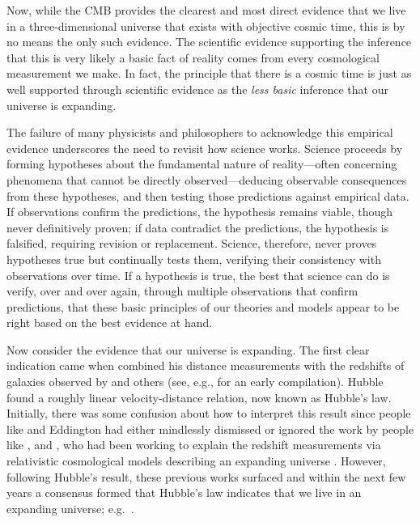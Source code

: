 \documentclass[aps,rmp,groupedaddress,twocolumn,10pt]{revtex4-2}
\begin{document}
Now, while the CMB provides the clearest and most direct evidence that we live in a three-dimensional universe that exists with objective cosmic time, this is by no means the only such evidence. The scientific evidence supporting the inference that this is very likely a basic fact of reality comes from every cosmological measurement we make. In fact, the principle that there is a cosmic time is just as well supported through scientific evidence as the \textit{less basic} inference that our universe is expanding.

The failure of many physicists and philosophers to acknowledge this empirical evidence underscores the need to revisit how science works. Science proceeds by forming hypotheses about the fundamental nature of reality---often concerning phenomena that cannot be directly observed---deducing observable consequences from these hypotheses, and then testing those predictions against empirical data. If observations confirm the predictions, the hypothesis remains viable, though never definitively proven; if data contradict the predictions, the hypothesis is falsified, requiring revision or replacement. Science, therefore, never proves hypotheses true but continually tests them, verifying their consistency with observations over time. If a hypothesis is true, the best that science can do is verify, over and over again, through multiple observations that confirm predictions, that these basic principles of our theories and models appear to be right based on the best evidence at hand.

Now consider the evidence that our universe is expanding. The first clear indication came when \citet{Hubble1929} combined his distance measurements with the redshifts of galaxies observed by \citet{Slipher1913} and others (see, e.g., \citet{Eddington1923} for an early compilation). Hubble found a roughly linear velocity-distance relation, now known as Hubble's law. Initially, there was some confusion about how to interpret this result since people like \citet{Einstein1922} and Eddington had either mindlessly dismissed or ignored the work by people like \citet{Friedmann1922,Friedmann1924}, \citet{Lemaitre1927} and \citet{Robertson1928}, who had been working to explain the redshift measurements via relativistic cosmological models describing an expanding universe \cite{Janzen2014}. However, following Hubble's result, these previous works surfaced and within the next few years a consensus formed that Hubble's law indicates that we live in an expanding universe; e.g.\ \cite{Eddington1933}.
\end{document}

